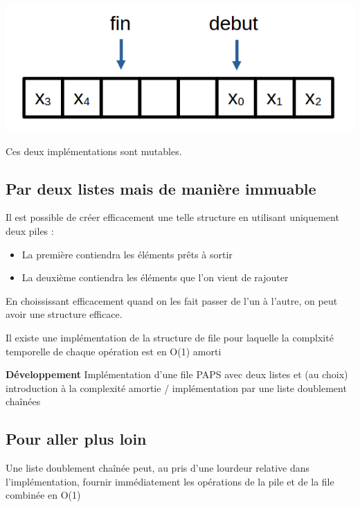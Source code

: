 \begin{center}
	\includegraphics[width=0.45\linewidth ]{lecon/05-piles_files/tableau_circulaire.png}
\end{center}


Ces deux implémentations sont mutables.

\subsection{Par deux listes mais de manière immuable}


\begin{idee}
	Il est possible de créer efficacement une telle structure en utilisant uniquement deux piles : 
	\begin{itemize}
		\item La première contiendra les éléments prêts à sortir
		\item La deuxième contiendra les éléments que l'on vient de rajouter
	\end{itemize}
\end{idee}


\begin{rem} 
	En choississant efficacement quand on les fait passer de l'un à l'autre, on peut avoir une structure efficace.
\end{rem}


\begin{proposition}
	Il existe une implémentation de la structure de file pour laquelle la complxité temporelle de chaque opération est en O(1) amorti
\end{proposition}


\textbf{Développement} Implémentation d'une file PAPS avec deux listes et (au choix) introduction à la complexité amortie / implémentation par une liste doublement chaînées

\subsection{Pour aller plus loin}

Une liste doublement chaînée peut, au pris d'une lourdeur relative dans l'implémentation, fournir immédiatement les opérations de la pile et de la file combinée en O(1)

